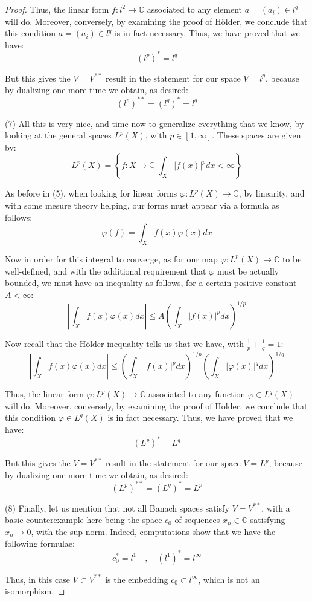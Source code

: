 \documentclass[12pt]{amsbook}
\begin{document}
\begin{proof}
Thus, the linear form $f:l^2\to\mathbb C$ associated to any element $a=(a_i)\in l^q$ will do. Moreover, conversely, by examining the proof of H\"older, we conclude that this condition $a=(a_i)\in l^q$ is in fact necessary. Thus, we have proved that we have:
$$(l^p)^*=l^q$$

But this gives the $V=V^{**}$ result in the statement for our space $V=l^p$, because by dualizing one more time we obtain, as desired:
$$(l^p)^{**}=(l^q)^*=l^q$$

(7) All this is very nice, and time now to generalize everything that we know, by looking at the general spaces $L^p(X)$, with $p\in[1,\infty]$. These spaces are given by:
$$L^p(X)=\left\{f:X\to\mathbb C\Big|\int_X|f(x)|^pdx<\infty\right\}$$

As before in (5), when looking for linear forms $\varphi:L^p(X)\to\mathbb C$, by linearity, and with some mesure theory helping, our forms must appear via a formula as follows:
$$\varphi(f)=\int_Xf(x)\varphi(x)dx$$

Now in order for this integral to converge, as for our map $\varphi:L^p(X)\to\mathbb C$ to be well-defined, and with the additional requirement that $\varphi$ must be actually bounded, we must have an inequality as follows, for a certain positive constant $A<\infty$:
$$\left|\int_Xf(x)\varphi(x)dx\right|\leq A\left(\int_X|f(x)|^pdx\right)^{1/p}$$

Now recall that the H\"older inequality tells us that we have, with $\frac{1}{p}+\frac{1}{q}=1$:
$$\left|\int_Xf(x)\varphi(x)dx\right|\leq\left(\int_X|f(x)|^pdx\right)^{1/p}\left(\int_X|\varphi(x)|^qdx\right)^{1/q}$$

Thus, the linear form $\varphi:L^p(X)\to\mathbb C$ associated to any function $\varphi\in L^q(X)$ will do. Moreover, conversely, by examining the proof of H\"older, we conclude that this condition $\varphi\in L^q(X)$ is in fact necessary. Thus, we have proved that we have:
$$(L^p)^*=L^q$$

But this gives the $V=V^{**}$ result in the statement for our space $V=L^p$, because by dualizing one more time we obtain, as desired:
$$(L^p)^{**}=(L^q)^*=L^p$$

(8) Finally, let us mention that not all Banach spaces satisfy $V=V^{**}$, with a basic counterexample here being the space $c_0$ of sequences $x_n\in\mathbb C$ satisfying $x_n\to0$, with the sup norm. Indeed, computations show that we have the following formulae:
$$c_0^*=l^1\quad,\quad (l^1)^*=l^\infty$$

Thus, in this case $V\subset V^{**}$ is the embedding $c_0\subset l^\infty$, which is not an isomorphism. 


\end{proof}
\end{document}
